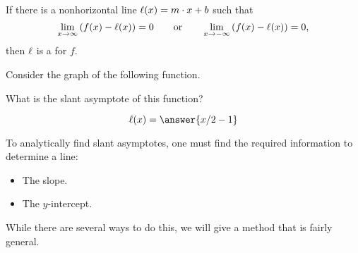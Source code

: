 \documentclass{ximera}
\begin{document}
\begin{definition}
  If there is a nonhorizontal line $\ell(x) = m\cdot x+b$ such that
  \[
  \lim_{x\to \infty}\left(f(x) - \l(x)\right) = 0 \qquad\text{or}\qquad \lim_{x\to -\infty} \left( f(x) - \l(x)\right) = 0,
  \]
  then $\ell$ is a  for $f$.
\end{definition}
\begin{question}
  Consider the graph of the following function. 
  \begin{image}
  \end{image}
  What is the slant asymptote of this function?
  \begin{prompt}
    \[
    \l(x) = \answer{x/2 -1}
    \]
  \end{prompt}
\end{question}

To analytically find slant asymptotes, one must find the required
information to determine a line:
\begin{itemize}
\item The slope.
\item The $y$-intercept.
\end{itemize}
While there are several ways to do this, we will give a method that is
fairly general.
\end{document}
